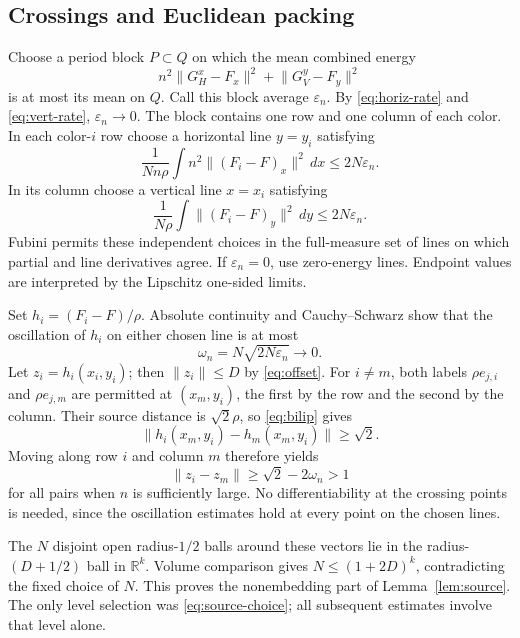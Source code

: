 \documentclass[11pt]{article}
\theoremstyle{remark}
\newcommand{\R}{\mathbb R}
\newcommand{\norm}[1]{\lVert#1\rVert}
\begin{document}
\subsection{Crossings and Euclidean packing}
Choose a period block $P\subset Q$ on which the mean combined energy
\[
 n^2\norm{G_H^x-F_x}^2+\norm{G_V^y-F_y}^2
\]
is at most its mean on $Q$. Call this block average $\varepsilon_n$. By \eqref{eq:horiz-rate} and \eqref{eq:vert-rate}, $\varepsilon_n\to0$. The block contains one row and one column of each color. In each color-$i$ row choose a horizontal line $y=y_i$ satisfying
\[
 \frac{1}{Nn\rho}\int n^2\norm{(F_i-F)_x}^2\,dx
 \le2N\varepsilon_n.
\]
In its column choose a vertical line $x=x_i$ satisfying
\[
 \frac{1}{N\rho}\int\norm{(F_i-F)_y}^2\,dy
 \le2N\varepsilon_n.
\]
Fubini permits these independent choices in the full-measure set of lines on which partial and line derivatives agree. If $\varepsilon_n=0$, use zero-energy lines. Endpoint values are interpreted by the Lipschitz one-sided limits.

Set $h_i=(F_i-F)/\rho$. Absolute continuity and Cauchy--Schwarz show that the oscillation of $h_i$ on either chosen line is at most
\[
 \omega_n=N\sqrt{2N\varepsilon_n}\longrightarrow0.
\]
Let $z_i=h_i(x_i,y_i)$; then $\norm{z_i}\le D$ by \eqref{eq:offset}. For $i\ne m$, both labels $\rho e_{j,i}$ and $\rho e_{j,m}$ are permitted at $(x_m,y_i)$, the first by the row and the second by the column. Their source distance is $\sqrt2\rho$, so \eqref{eq:bilip} gives
\[
 \norm{h_i(x_m,y_i)-h_m(x_m,y_i)}\ge\sqrt2.
\]
Moving along row $i$ and column $m$ therefore yields
\[
 \norm{z_i-z_m}\ge\sqrt2-2\omega_n>1
\]
for all pairs when $n$ is sufficiently large. No differentiability at the crossing points is needed, since the oscillation estimates hold at every point on the chosen lines.

The $N$ disjoint open radius-$1/2$ balls around these vectors lie in the radius-$(D+1/2)$ ball in $\R^k$. Volume comparison gives $N\le(1+2D)^k$, contradicting the fixed choice of $N$. This proves the nonembedding part of Lemma~\ref{lem:source}. The only level selection was \eqref{eq:source-choice}; all subsequent estimates involve that level alone.
\end{document}
